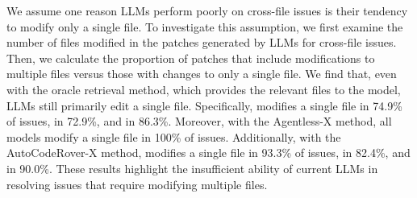 We assume one reason LLMs perform poorly on cross-file issues is their tendency to modify only a single file. To investigate this assumption, we first examine the number of files modified in the patches generated by LLMs for cross-file issues. Then, we calculate the proportion of patches that include modifications to multiple files versus those with changes to only a single file. We find that, even with the oracle retrieval method, which provides the relevant files to the model, LLMs still primarily edit a single file. Specifically, \Claude modifies a single file in 74.9\% of issues, \GPT in 72.9\%, and \DeepSeek in 86.3\%. Moreover, with the Agentless-X method, all models modify a single file in 100\% of issues. Additionally, with the AutoCodeRover-X method, \Claude modifies a single file in 93.3\% of issues, \GPT in 82.4\%, and \DeepSeek in 90.0\%.  These results highlight the insufficient ability of current LLMs in resolving issues that require modifying multiple files.




